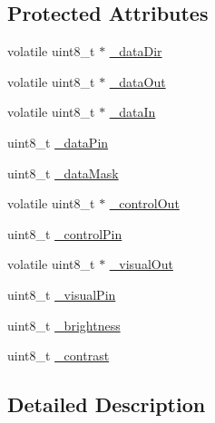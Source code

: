 \subsection*{\-Protected \-Attributes}
\begin{DoxyCompactItemize}
\item 
volatile uint8\-\_\-t $\ast$ \hyperlink{class_m_h_v___display___h_d44780___direct___connect_a03135ac9561c3b8c58f00f9888d02526}{\-\_\-data\-Dir}
\item 
volatile uint8\-\_\-t $\ast$ \hyperlink{class_m_h_v___display___h_d44780___direct___connect_aebdad9827430f3471e92c96ac162a0e8}{\-\_\-data\-Out}
\item 
volatile uint8\-\_\-t $\ast$ \hyperlink{class_m_h_v___display___h_d44780___direct___connect_af08537a357d3e09e268f193f87242180}{\-\_\-data\-In}
\item 
uint8\-\_\-t \hyperlink{class_m_h_v___display___h_d44780___direct___connect_a9a2cf1d983db8d70a196cbf6d36140b8}{\-\_\-data\-Pin}
\item 
uint8\-\_\-t \hyperlink{class_m_h_v___display___h_d44780___direct___connect_afbadbde61cef93fe49e29e4b4de37ea2}{\-\_\-data\-Mask}
\item 
volatile uint8\-\_\-t $\ast$ \hyperlink{class_m_h_v___display___h_d44780___direct___connect_a3d308de0a3d1f48dc28ec3a0cd416373}{\-\_\-control\-Out}
\item 
uint8\-\_\-t \hyperlink{class_m_h_v___display___h_d44780___direct___connect_aa40764017ac7a0c213736c761e6db379}{\-\_\-control\-Pin}
\item 
volatile uint8\-\_\-t $\ast$ \hyperlink{class_m_h_v___display___h_d44780___direct___connect_ae69106ff6193c454881e09cfa322be8c}{\-\_\-visual\-Out}
\item 
uint8\-\_\-t \hyperlink{class_m_h_v___display___h_d44780___direct___connect_aab09401fa30a20f1e082d09d1c20e959}{\-\_\-visual\-Pin}
\item 
uint8\-\_\-t \hyperlink{class_m_h_v___display___h_d44780___direct___connect_ab5af02b6c4a31228b8cba9793270fe79}{\-\_\-brightness}
\item 
uint8\-\_\-t \hyperlink{class_m_h_v___display___h_d44780___direct___connect_ae7c1f3a285e1ed271227fb68a5f83c38}{\-\_\-contrast}
\end{DoxyCompactItemize}


\subsection{\-Detailed \-Description}


